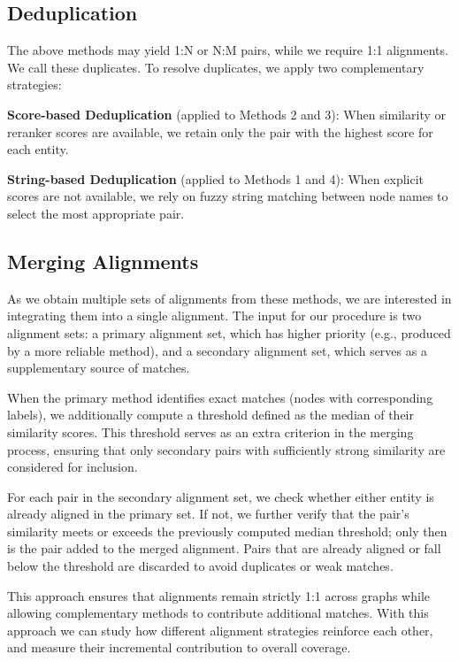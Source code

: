 \documentclass[11pt]{article}
\begin{document}
\subsection{Deduplication}

The above methods may yield 1:N or N:M pairs, while we require 1:1 alignments. We call these duplicates. To resolve duplicates, we apply two complementary strategies:

\textbf{Score-based Deduplication} (applied to Methods 2 and 3): When similarity or reranker scores are available, we retain only the pair with the highest score for each entity.

\textbf{String-based Deduplication} (applied to Methods 1 and 4): When explicit scores are not available, we rely on fuzzy string matching between node names to select the most appropriate pair.

\subsection{Merging Alignments}

As we obtain multiple sets of alignments from these methods, we are interested in integrating them into a single alignment. The input for our procedure is two alignment sets: a primary alignment set, which has higher priority (e.g., produced by a more reliable method), and a secondary alignment set, which serves as a supplementary source of matches.

When the primary method identifies exact matches (nodes with corresponding labels), we additionally compute a threshold defined as the median of their similarity scores. This threshold serves as an extra criterion in the merging process, ensuring that only secondary pairs with sufficiently strong similarity are considered for inclusion.

For each pair in the secondary alignment set, we check whether either entity is already aligned in the primary set. If not, we further verify that the pair’s similarity meets or exceeds the previously computed median threshold; only then is the pair added to the merged alignment. Pairs that are already aligned or fall below the threshold are discarded to avoid duplicates or weak matches.

This approach ensures that alignments remain strictly 1:1 across graphs while allowing complementary methods to contribute additional matches. With this approach we can study how different alignment strategies reinforce each other, and measure their incremental contribution to overall coverage.
\end{document}
